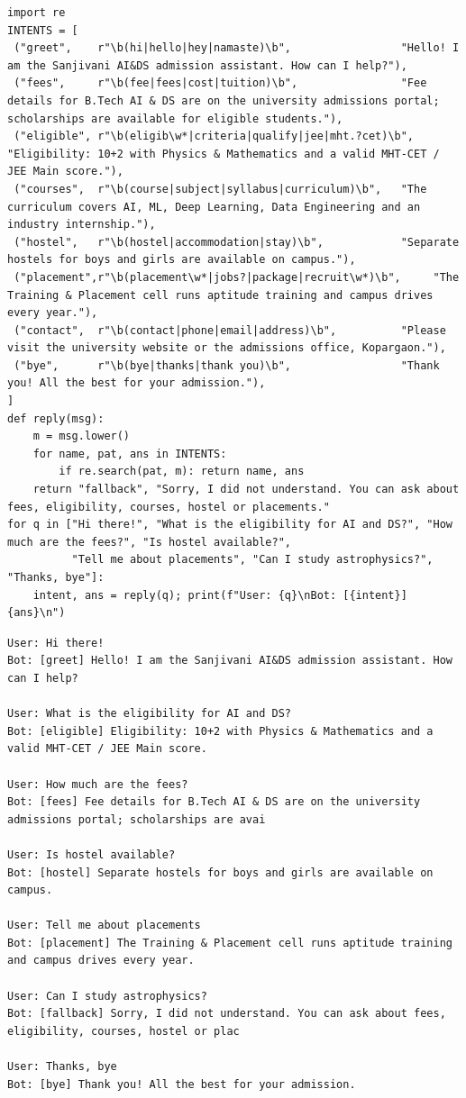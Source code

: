 \documentclass[11pt]{article}
\begin{document}
\begin{lstlisting}[style=py]
import re
INTENTS = [
 ("greet",    r"\b(hi|hello|hey|namaste)\b",                 "Hello! I am the Sanjivani AI&DS admission assistant. How can I help?"),
 ("fees",     r"\b(fee|fees|cost|tuition)\b",                "Fee details for B.Tech AI & DS are on the university admissions portal; scholarships are available for eligible students."),
 ("eligible", r"\b(eligib\w*|criteria|qualify|jee|mht.?cet)\b", "Eligibility: 10+2 with Physics & Mathematics and a valid MHT-CET / JEE Main score."),
 ("courses",  r"\b(course|subject|syllabus|curriculum)\b",   "The curriculum covers AI, ML, Deep Learning, Data Engineering and an industry internship."),
 ("hostel",   r"\b(hostel|accommodation|stay)\b",            "Separate hostels for boys and girls are available on campus."),
 ("placement",r"\b(placement\w*|jobs?|package|recruit\w*)\b",     "The Training & Placement cell runs aptitude training and campus drives every year."),
 ("contact",  r"\b(contact|phone|email|address)\b",          "Please visit the university website or the admissions office, Kopargaon."),
 ("bye",      r"\b(bye|thanks|thank you)\b",                 "Thank you! All the best for your admission."),
]
def reply(msg):
    m = msg.lower()
    for name, pat, ans in INTENTS:
        if re.search(pat, m): return name, ans
    return "fallback", "Sorry, I did not understand. You can ask about fees, eligibility, courses, hostel or placements."
for q in ["Hi there!", "What is the eligibility for AI and DS?", "How much are the fees?", "Is hostel available?",
          "Tell me about placements", "Can I study astrophysics?", "Thanks, bye"]:
    intent, ans = reply(q); print(f"User: {q}\nBot: [{intent}] {ans}\n")
\end{lstlisting}
\begin{lstlisting}[style=out]
User: Hi there!
Bot: [greet] Hello! I am the Sanjivani AI&DS admission assistant. How can I help?

User: What is the eligibility for AI and DS?
Bot: [eligible] Eligibility: 10+2 with Physics & Mathematics and a valid MHT-CET / JEE Main score.

User: How much are the fees?
Bot: [fees] Fee details for B.Tech AI & DS are on the university admissions portal; scholarships are avai

User: Is hostel available?
Bot: [hostel] Separate hostels for boys and girls are available on campus.

User: Tell me about placements
Bot: [placement] The Training & Placement cell runs aptitude training and campus drives every year.

User: Can I study astrophysics?
Bot: [fallback] Sorry, I did not understand. You can ask about fees, eligibility, courses, hostel or plac

User: Thanks, bye
Bot: [bye] Thank you! All the best for your admission.
\end{lstlisting}
\end{document}
